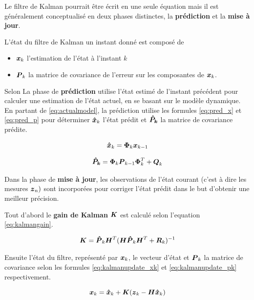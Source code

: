 \documentclass[12pt,a4paper]{report}
\begin{document}
	Le filtre de Kalman pourrait être écrit en une seule équation mais il est généralement conceptualisé en deux phases distinctes, la \textbf{prédiction} et la \textbf{mise à jour}.
	
	\para L'état du filtre de Kalman un instant donné est composé de \begin{itemize}
		\item $\boldsymbol{x}_k$ l'estimation de l'état à l'instant $k$
		\item $\boldsymbol{P}_k$ la matrice de covariance de l'erreur sur les composantes de $\boldsymbol{x}_k$.
	\end{itemize}

	\para Selon \cite{menegatti_generalized_2016} La phase de \textbf{prédiction} utilise l'état estimé de l'instant précédent pour calculer une estimation de l'état actuel, en se basant sur le modèle dynamique. En partant de \ref{eq:actualmodel}, la prédiction utilise les formules \ref{eq:pred_x} et \ref{eq:pred_p} pour déterminer $\boldsymbol{\hat{x}}_k$ l'état prédit et $\boldsymbol{\hat{P}_k}$ la matrice de covariance prédite.
	
	\begin{equation}
		\label{eq:pred_x}
		\boldsymbol{\hat{x}}_k = \boldsymbol{\Phi}_k \boldsymbol{x}_{k-1}
	\end{equation}
	
	\begin{equation}
		\label{eq:pred_p}
		\boldsymbol{\hat{P}_k} = \boldsymbol{\Phi}_k \boldsymbol{P}_{k-1} \boldsymbol{\Phi}_k^T + \boldsymbol{Q}_k
	\end{equation}
	
	
	
	\para Dans la phase de \textbf{mise à jour}, les observations de l'état courant (c'est à dire les mesures $\boldsymbol{z}_n)$ sont incorporées pour corriger l'état prédit dans le but d'obtenir une meilleur précision.
	
	\para Tout d'abord le \textbf{gain de Kalman} $\boldsymbol{K}$ est calculé selon l'equation \ref{eq:kalmangain}.
	
	\begin{equation}
	\label{eq:kalmangain}
	\boldsymbol{K} = \boldsymbol{\hat{P}}_k \boldsymbol{H}^T (\boldsymbol{H} \boldsymbol{\hat{P}}_k \boldsymbol{H}^T + \boldsymbol{R}_k ) ^{-1}
	\end{equation}
	
	
	\para Ensuite l'état du filtre, représenté par $\boldsymbol{x}_k$, le vecteur d'état et $\boldsymbol{P}_k$ la matrice de covariance selon les formules \ref{eq:kalmanupdate_xk} et \ref{eq:kalmanupdate_pk} respectivement.
	
	\begin{equation}
	\label{eq:kalmanupdate_xk}
	\boldsymbol{x}_k = \boldsymbol{\hat{x}}_k + \boldsymbol{K} (\boldsymbol{z}_k - \boldsymbol{H \hat{x}}_k)
	\end{equation}
	
\end{document}
